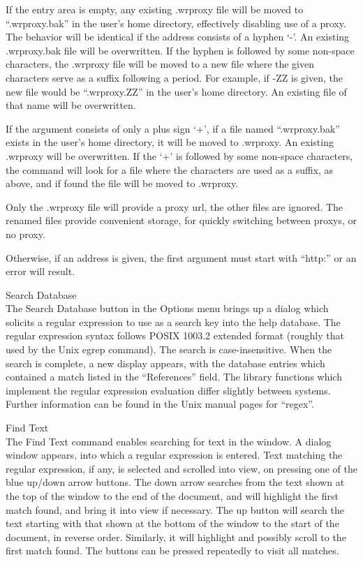 \begin{description}
If the entry area is empty, any existing {\vt .wrproxy} file will be
moved to ``{\vt .wrproxy.bak}'' in the user's home directory,
effectively disabling use of a proxy.  The behavior will be identical
if the address consists of a hyphen `{\vt -}'.  An existing {\vt
.wrproxy.bak} file will be overwritten.  If the hyphen is followed by
some non-space characters, the {\vt .wrproxy} file will be moved to a
new file where the given characters serve as a suffix following a
period.  For example, if {\vt -ZZ} is given, the new file would be
``{\vt .wrproxy.ZZ}'' in the user's home directory.  An existing file
of that name will be overwritten.

If the argument consists of only a plus sign `{\vt +}', if a file
named ``{\vt .wrproxy.bak}'' exists in the user's home directory, it
will be moved to {\vt .wrproxy}.  An existing {\vt .wrproxy} will be
overwritten.  If the `{\vt +}' is followed by some non-space
characters, the command will look for a file where the characters are
used as a suffix, as above, and if found the file will be moved to
{\vt .wrproxy}.

Only the {\vt .wrproxy} file will provide a proxy url, the other files
are ignored.  The renamed files provide convenient storage, for
quickly switching between proxys, or no proxy.

Otherwise, if an address is given, the first argument must start with
``{\vt http:}'' or an error will result.

\item{\cb Search Database}\\
The {\cb Search Database} button in the {\cb Options} menu brings up a
dialog which solicits a regular expression to use as a search key into
the help database.  The regular expression syntax follows POSIX 1003.2
extended format (roughly that used by the Unix {\vt egrep} command). 
The search is case-insensitive.  When the search is complete, a new
display appears, with the database entries which contained a match
listed in the ``References'' field.  The library functions which
implement the regular expression evaluation differ slightly between
systems.  Further information can be found in the Unix manual pages
for ``regex''.

\item{\cb Find Text}\\
The {\cb Find Text} command enables searching for text in the window. 
A dialog window appears, into which a regular expression is entered. 
Text matching the regular expression, if any, is selected and scrolled
into view, on pressing one of the blue up/down arrow buttons.  The
down arrow searches from the text shown at the top of the window to
the end of the document, and will highlight the first match found, and
bring it into view if necessary.  The up button will search the text
starting with that shown at the bottom of the window to the start of
the document, in reverse order.  Similarly, it will highlight and
possibly scroll to the first match found.  The buttons can be pressed
repeatedly to visit all matches.


\end{description}
